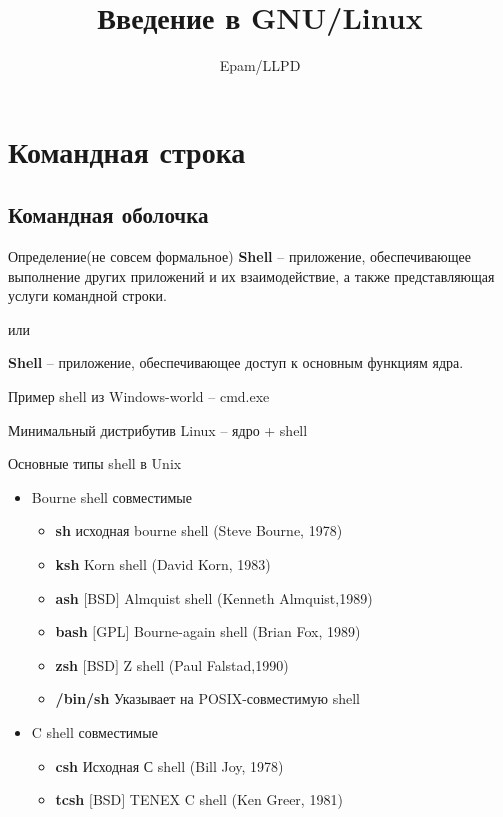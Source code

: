 \documentclass[ignorenonframetext, professionalfonts, hyperref={pdftex, unicode}]{beamer}
\title{Введение в GNU/Linux}
\author{Epam/LLPD}
\begin{document}
\section{Командная строка}


\frame{
	\frametitle{}
	\titlepage
	\vspace{-0.5cm}
	\begin{center}
	\end{center}
}
\frame{
	\tableofcontents
}

\subsection{Командная оболочка}
\begin{frame}[fragile]{Определение(не совсем формальное)}
\textbf{Shell} -- приложение, обеспечивающее выполнение других приложений и их взаимодействие, а также представляющая услуги командной строки. 
\begin{center}
  или
\end{center}
\textbf{Shell} -- приложение, обеспечивающее доступ к основным функциям ядра.

\pause
\vspace{0.5in}
Пример shell из Windows-world -- cmd.exe
\vspace{0.5in}

Минимальный дистрибутив Linux -- ядро + shell 

\end{frame}
\begin{frame}[fragile]{Основные типы shell в Unix}
  \begin{itemize}
    \item Bourne shell совместимые
      \begin{itemize}
        \item \textbf{sh} исходная bourne shell (Steve Bourne, 1978)
        \item \textbf{ksh} Korn shell (David Korn, 1983)
        \item \textbf{ash} $[$BSD$]$ Almquist shell (Kenneth Almquist,1989)  
        \item \textbf{bash} $[$GPL$]$ Bourne-again shell (Brian Fox, 1989)
        \item \textbf{zsh} $[$BSD$]$ Z shell (Paul Falstad,1990)
        \item \textbf{/bin/sh} Указывает на POSIX-совместимую shell
      \end{itemize}
  \item C shell совместимые
      \begin{itemize}
        \item \textbf{csh}  Исходная С shell (Bill Joy, 1978)
        \item \textbf{tcsh} $[$BSD$]$ TENEX C shell (Ken Greer, 1981)
       \end{itemize}
  \end{itemize}
\end{frame}
\end{document}
